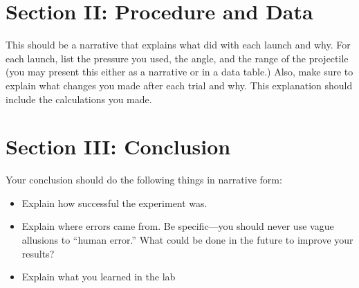 \documentclass[10pt]{exam}
\begin{document}

\pagebreak

\section*{Section II: Procedure and Data}
This should be a narrative that explains what did with each launch and why.  For each launch, list the pressure you used, the angle, and the range of the projectile (you may present this either as a narrative or in a data table.)  Also, make sure to explain what changes you made after each trial and why.  This explanation should include the calculations you made.


\pagebreak



\pagebreak


\section*{Section III: Conclusion}
Your conclusion should do the following things in narrative form:
\begin{itemize}
  \item[a.] Explain how successful the experiment was.
  \item[b.] Explain where errors came from. Be specific—you should never use vague allusions to “human error.”  What could be done in the future to improve your results?
  \item[c.] Explain what you learned in the lab
\end{itemize}

\end{document}

